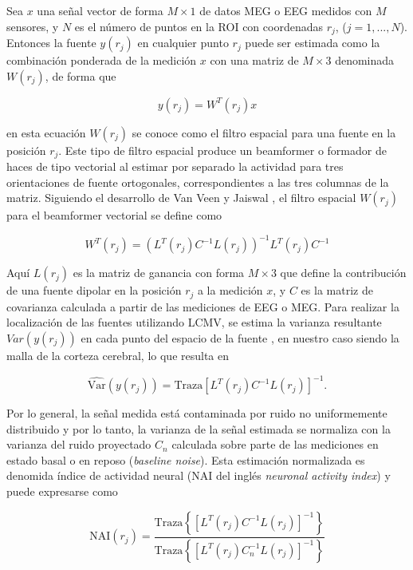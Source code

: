 Sea $x$ una señal vector de forma $M \times 1$ de datos MEG o EEG medidos con $M$ sensores, y $N$ es el número de puntos en la ROI con coordenadas $r_j$, ($j = 1, ..., N$). Entonces la fuente $y(r_j)$ en cualquier punto $r_j$ puede ser estimada como la combinación ponderada de la medición $x$ con una matriz de $M \times 3$ denominada $W(r_j)$, de forma que

\begin{equation}
y(r_j) = W^{T}(r_j)x
\end{equation}

en esta ecuación $W(r_j)$ se conoce como el filtro espacial para una fuente en la posición $r_j$. Este tipo de filtro espacial produce un beamformer o formador de haces de tipo vectorial al estimar por separado la actividad para tres orientaciones de fuente ortogonales, correspondientes a las tres columnas de la matriz. Siguiendo el desarrollo de Van Veen y Jaiswal \cite{VanVeen1997,Jaiswal2020}, el filtro espacial $W(r_j)$ para el beamformer vectorial se define como

\begin{equation}
W^{T}(r_j) = (L^{T}(r_j)C^{-1}L(r_j))^{-1}L^{T}(r_j)C^{-1}
\end{equation}

Aquí $L(r_j)$ es la matriz de ganancia con forma $M \times 3$ que define la contribución de una fuente dipolar en la posición $r_j$ a la medición $x$, y $C$ es la matriz de covarianza calculada a partir de las mediciones de EEG o MEG. Para realizar la localización de las fuentes utilizando LCMV, se estima la varianza resultante $Var(y(r_j))$ en cada punto del espacio de la fuente \cite{VanVeen1997,Jaiswal2020}, en nuestro caso siendo la malla de la corteza cerebral, lo que resulta en

\begin{equation}
\widehat{\text{Var}}(y(r_j)) = \text{Traza}[L^{T}(r_j)C^{-1}L(r_j)]^{-1}.
\end{equation}

Por lo general, la señal medida está contaminada por ruido no uniformemente distribuido y por lo tanto, la varianza de la señal estimada se normaliza con la varianza del ruido proyectado $C_n$ calculada sobre parte de las mediciones en estado basal o en reposo (\emph{baseline noise}). Esta estimación normalizada es denomida índice de actividad neural (NAI del inglés \emph{neuronal activity index}) \cite{VanVeen1997} y puede expresarse como

\begin{equation}
\text{NAI}(r_j) = \frac{\text{Traza}\left\{[L^{T}(r_j)C^{-1}L(r_j)]^{-1}\right\}}{\text{Traza}\left\{[L^{T}(r_j)C_n^{-1}L(r_j)]^{-1}\right\}}
\end{equation}

